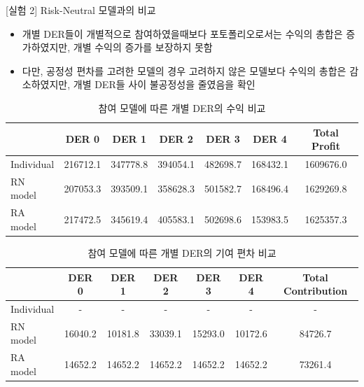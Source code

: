 \documentclass[xcolor=dvipsnames,t,9pt]{beamer}
\begin{document}
\begin{frame}{[실험 2] Risk-Neutral 모델과의 비교}
    \begin{block}{}
        \begin{itemize}
            \item 개별 DER들이 개별적으로 참여하였을때보다 포토폴리오로서는 수익의 총합은 증가하였지만, 개별 수익의 증가를 보장하지 못함
            \item 다만, 공정성 편차를 고려한 모델의 경우 고려하지 않은 모델보다 수익의 총합은 감소하였지만, 개별 DER들 사이 불공정성을 줄였음을 확인
        \end{itemize}
        \end{block}

    \vspace{-0.5em}
    \begin{table}[]
        \footnotesize
        \caption{참여 모델에 따른 개별 DER의 수익 비교}
        \begin{tabular}{lcccccc}
            \toprule
                       & DER 0 & DER 1 & DER 2 & DER 3 & DER 4 & Total Profit \\ \midrule
            Individual & 216712.1      & 347778.8      & 394054.1      &482698.7       & 168432.1      &1609676.0             \\
            RN model   & 207053.3      & 393509.1      & 358628.3      &501582.7       &168496.4       & 1629269.8             \\
            RA model   & 217472.5      & 345619.4      & 405583.1      & 502698.6      & 153983.5      & 1625357.3             \\ \bottomrule
        \end{tabular}
    \end{table}

    \vspace{-1em}

    \begin{table}[]
        \footnotesize
        \caption{참여 모델에 따른 개별 DER의 기여 편차 비교}
        \begin{tabular}{lcccccc}
            \toprule
                       & DER 0 & DER 1 & DER 2 & DER 3 & DER 4 & Total Contribution \\ \midrule
            Individual & -      & -      & -      & -      & -      & -             \\
            RN model   & 16040.2      & 10181.8      & 33039.1      & 15293.0      & 10172.6      & 84726.7             \\
            RA model   & 14652.2      & 14652.2      & 14652.2      & 14652.2      & 14652.2      & 73261.4             \\ \bottomrule
        \end{tabular}
    \end{table}

\end{frame}
\end{document}
